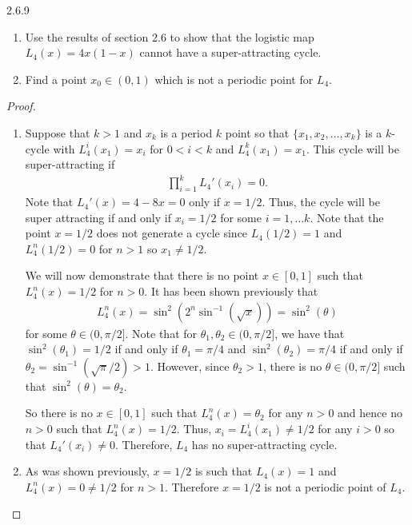 \begin{problem}{2.6.9}
  \begin{enumerate}
    \item Use the results of section 2.6 to show that the logistic map $L_4(x) = 4x(1-x)$
      cannot have a super-attracting cycle.
    \item Find a point $x_0 \in (0, 1)$ which is not a periodic point for $L_4$.
  \end{enumerate}
\end{problem}

\begin{proof}
  \begin{enumerate}
  \item Suppose that $k > 1$ and $x_k$ is a period $k$ point so that $\{x_1, x_2, \dots, x_k\}$
    is a $k$-cycle with $L_4^i(x_1) = x_i$ for $0 < i < k$ and $L_4^k(x_1) = x_1$. This cycle will be super-attracting if
    \begin{align*}
      \prod_{i=1}^k L_4'(x_i) = 0.
    \end{align*}
    Note that $L_4'(x) = 4 - 8x = 0$ only if $x=1/2$. Thus, the cycle will be super attracting
    if and only if $x_i = 1/2$ for some $i=1,\dots k$. Note that the point $x = 1/2$ does not generate a cycle since
    $L_4(1/2) = 1$ and $L_4^n(1/2) = 0$ for $n > 1$ so $x_1 \neq 1/2$.

    We will now demonstrate that there is no point $x\in[0, 1]$ such that $L_4^n(x) = 1/2$ for $n>0$.
    It has been shown previously that
    \begin{align*}
      L_4^n(x) = \sin^2\left(2^n\sin^{-1}\left(\sqrt{x}\right)\right)= \sin^2(\theta)
    \end{align*}
    for some $\theta \in (0, \pi/2]$. Note that for $\theta_1, \theta_2 \in(0, \pi/2]$, we have that
    $\sin^2(\theta_1) = 1/2$ if and only if $\theta_1 = \pi/4$ and
    $\sin^2(\theta_2) = \pi/4$ if and only if $\theta_2 = \sin^{-1}\left(\sqrt{\pi}/2\right) > 1$. However, since $\theta_2 > 1$,
    there is no $\theta\in (0, \pi/2]$ such that $\sin^2(\theta) = \theta_2$.

    So there is no $x\in[0,1]$ such that $L_4^n(x) = \theta_2$ for any $n>0$ and hence no $n>0$ such that $L_4^n(x) = 1/2$.
    Thus, $x_i =L_4^i(x_1) \neq 1/2$ for any $i > 0$ so that $L_4'(x_i)\neq 0$.
    Therefore, $L_4$ has no super-attracting cycle.
    \item As was shown previously, $x=1/2$ is such that $L_4(x) = 1$ and $L_4^n(x) = 0\neq 1/2$ for $n > 1$.
      Therefore $x=1/2$ is not a periodic point of $L_4$.
  \end{enumerate}
\end{proof}
\newpage
